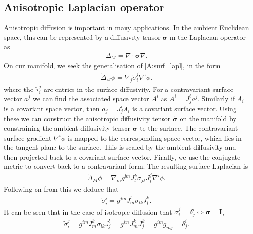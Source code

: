 \subsection{Anisotropic Laplacian operator}
\label{s:anisotropic}
Anisotropic diffusion is important in many applications. In the ambient 
Euclidean space, this can be represented by a diffusivity tensor $\bm{\sigma}$ 
in the Laplacian operator as
\begin{align*}
\Delta_M = \nabla \cdot \bm{\sigma} \nabla.
\end{align*}
On our manifold, we seek the generalisation of \ref{A:surf_lapl}, in the form
\begin{align*}
\tilde{\Delta}_M \phi = \nabla_j \tilde{\sigma}_i^j \nabla^i \phi.
\end{align*}
where the $\tilde{\sigma}_i^j$ are entries in the surface diffusivity.
For a contravariant surface vector $a^j$ we can find the associated
space vector $A^i$ as $A^i = J^i_j a^j$. Similarly if $A_i$ is a covariant space vector, then $a_j=J^i_j A_i$ is a covariant surface vector. 
Using these we can construct the anisotropic
diffusivity tensor $\tilde{\bm{\sigma}}$ on the manifold by constraining the ambient diffusivity tensor $\bm{\sigma}$ to the surface. The contravariant surface gradient $\nabla^i \phi$ is mapped to the corresponding space vector, which lies in the tangent plane to the surface. This is scaled by the ambient diffusivity and then projected back to a covariant surface vector. Finally, we use the conjugate metric to convert back to a contravariant form. The resulting surface Laplacian is 
\begin{align*}
    \tilde{\Delta}_M \phi = \nabla_m g^{lm}J^k_l\sigma_{jk}J^j_i \nabla^i \phi.
\end{align*}
Following on from this we deduce that
\begin{align*}
    \tilde{\sigma}_i^j = g^{jm} J^l_m \sigma_{lk} J^k_i.
\end{align*}
It can be seen that in the case of isotropic diffusion that $\tilde{\sigma}_i^j = \delta^i_j \Leftrightarrow \bm{\sigma} = \bm{I}$,
\begin{align*}
    \tilde{\sigma}_i^j = g^{im} J^k_m \sigma_{lk} J^l_j = g^{im} J^k_m J^k_j = g^{im} g_{mj} = \delta^i_j.
\end{align*}
